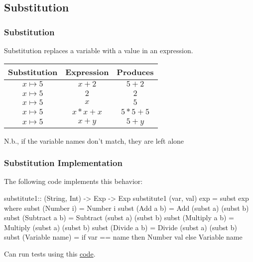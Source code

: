 \documentclass{beamer}
\newenvironment{codeblock}[1][.8]{%
\begin{columns}
\begin{column}{#1\linewidth}
\begin{exampleblock}{}}{%
\end{exampleblock}
\end{column}
\end{columns}}
\begin{document}
\subsection{Substitution}


\begin{frame}[fragile]
\frametitle{Substitution}
Substitution replaces a variable with a value in an expression. 
\vfill
\begin{tabular}{|c|c|c|}
\hline
Substitution & Expression & Produces\\
\hline\hline
$x \mapsto 5$ & $x+2$ & $5+2$
\\
$x \mapsto 5$ & $2$ & $2$
\\
$x \mapsto 5$ & $x$ & $5$
\\
$x \mapsto 5$ & $x*x+x$ & $5*5+5$
\\
$x \mapsto 5$ & $x+y$ & $5+y$
\\\hline
\end{tabular}

\vfill\pause
N.b., if the variable names don't match, they are left alone
\end{frame}

\begin{frame}[fragile]
\frametitle{Substitution Implementation}

The following code implements this behavior:
\vfill
\begin{tinycode}
substitute1:: (String, Int) -> Exp -> Exp
substitute1 (var, val) exp = subst exp where
  subst (Number i)      = Number i
  subst (Add a b)       = Add (subst a) (subst b)
  subst (Subtract a b)  = Subtract (subst a) (subst b)
  subst (Multiply a b)  = Multiply (subst a) (subst b)
  subst (Divide a b)    = Divide (subst a) (subst b)
  subst (Variable name) = if var == name
                          then Number val
                          else Variable name
\end{tinycode}

Can run tests using this \href{https://harrisonwl.github.io/assets/courses/popl/fall2016/aopl/code/SubstituteTest.hs.htm}{code}.

\end{frame}

\end{document}
